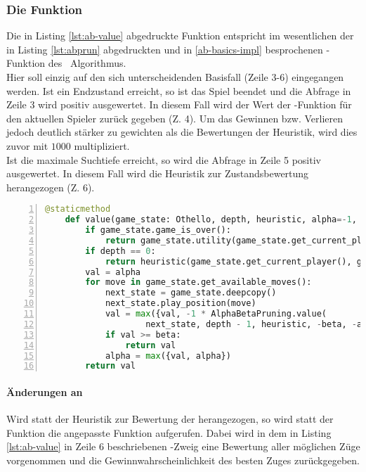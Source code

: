 \subsubsection{Die Funktion }
Die in Listing \ref{lst:ab-value} abgedruckte Funktion  entspricht im wesentlichen der in Listing \ref{lst:abprun} abgedruckten und in \ref{ab-basics-impl} besprochenen -Funktion des \abab\ Algorithmus.
\\Hier soll einzig auf den sich unterscheidenden Basisfall (Zeile 3-6) eingegangen werden. Ist ein Endzustand erreicht, so ist das Spiel beendet und die Abfrage in Zeile 3 wird positiv ausgewertet. In diesem Fall wird der Wert der -Funktion für den aktuellen Spieler zurück gegeben (Z. 4). Um das Gewinnen bzw. Verlieren jedoch deutlich stärker zu gewichten als die Bewertungen der Heuristik, wird dies zuvor mit $1000$ multipliziert.
\\Ist die maximale Suchtiefe erreicht, so wird die Abfrage in Zeile 5 positiv ausgewertet. In diesem Fall wird die Heuristik zur Zustandsbewertung herangezogen (Z. 6).
\begin{lstlisting}[basicstyle=\footnotesize, caption = {\code{value} Funktion des Alpha-Beta Spielers}, language = python, captionpos = t , numbers=left, label={lst:ab-value}]
    @staticmethod
    def value(game_state: Othello, depth, heuristic, alpha=-1, beta=1):
        if game_state.game_is_over():
            return game_state.utility(game_state.get_current_player()) * 1000
        if depth == 0:
            return heuristic(game_state.get_current_player(), game_state)
        val = alpha
        for move in game_state.get_available_moves():
            next_state = game_state.deepcopy()
            next_state.play_position(move)
            val = max({val, -1 * AlphaBetaPruning.value(
            		next_state, depth - 1, heuristic, -beta, -alpha)})
            if val >= beta:
                return val
            alpha = max({val, alpha})
        return val
\end{lstlisting}
\paragraph{Änderungen an }
Wird statt der Heuristik zur Bewertung der  herangezogen, so wird statt der Funktion  die angepasste Funktion  aufgerufen. Dabei wird in dem in Listing \ref{lst:ab-value} in Zeile 6 beschriebenen -Zweig eine Bewertung aller möglichen Züge vorgenommen und die Gewinnwahrscheinlichkeit des besten Zuges zurückgegeben. 

